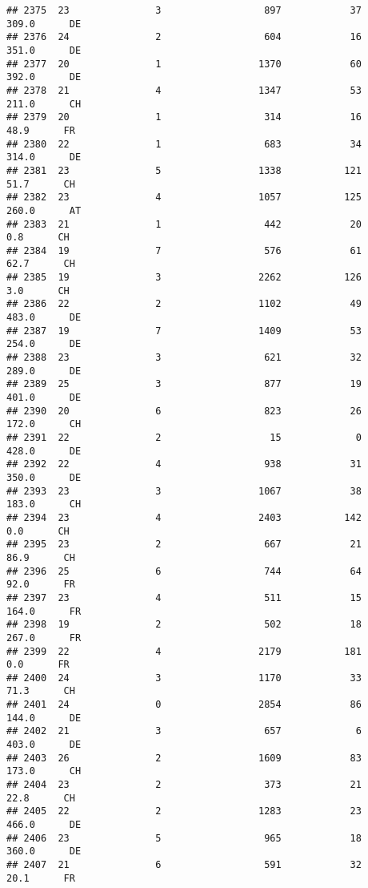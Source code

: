 \documentclass[
]{article}
\begin{document}
\begin{verbatim}
## 2375  23               3                  897            37    309.0      DE
## 2376  24               2                  604            16    351.0      DE
## 2377  20               1                 1370            60    392.0      DE
## 2378  21               4                 1347            53    211.0      CH
## 2379  20               1                  314            16     48.9      FR
## 2380  22               1                  683            34    314.0      DE
## 2381  23               5                 1338           121     51.7      CH
## 2382  23               4                 1057           125    260.0      AT
## 2383  21               1                  442            20      0.8      CH
## 2384  19               7                  576            61     62.7      CH
## 2385  19               3                 2262           126      3.0      CH
## 2386  22               2                 1102            49    483.0      DE
## 2387  19               7                 1409            53    254.0      DE
## 2388  23               3                  621            32    289.0      DE
## 2389  25               3                  877            19    401.0      DE
## 2390  20               6                  823            26    172.0      CH
## 2391  22               2                   15             0    428.0      DE
## 2392  22               4                  938            31    350.0      DE
## 2393  23               3                 1067            38    183.0      CH
## 2394  23               4                 2403           142      0.0      CH
## 2395  23               2                  667            21     86.9      CH
## 2396  25               6                  744            64     92.0      FR
## 2397  23               4                  511            15    164.0      FR
## 2398  19               2                  502            18    267.0      FR
## 2399  22               4                 2179           181      0.0      FR
## 2400  24               3                 1170            33     71.3      CH
## 2401  24               0                 2854            86    144.0      DE
## 2402  21               3                  657             6    403.0      DE
## 2403  26               2                 1609            83    173.0      CH
## 2404  23               2                  373            21     22.8      CH
## 2405  22               2                 1283            23    466.0      DE
## 2406  23               5                  965            18    360.0      DE
## 2407  21               6                  591            32     20.1      FR

\end{verbatim}
\end{document}
